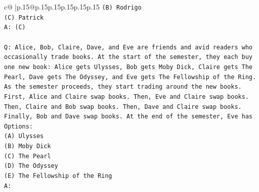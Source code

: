 \documentclass{article}
\begin{document}
{\begin{supertabular}{c@{$\;$}|p{.15\linewidth}@{}p{.15\linewidth}p{.15\linewidth}p{.15\linewidth}p{.15\linewidth}p{.15\linewidth}}
{{{\texttt{(B) Rodrigo} \\
\texttt{(C) Patrick} \\
\texttt{A: (C)} \\
\\ 
\texttt{Q: Alice, Bob, Claire, Dave, and Eve are friends and avid readers who occasionally trade books. At the start of the semester, they each buy one new book: Alice gets Ulysses, Bob gets Moby Dick, Claire gets The Pearl, Dave gets The Odyssey, and Eve gets The Fellowship of the Ring.} \\
\texttt{As the semester proceeds, they start trading around the new books. First, Alice and Claire swap books. Then, Eve and Claire swap books. Then, Claire and Bob swap books. Then, Dave and Claire swap books. Finally, Bob and Dave swap books. At the end of the semester, Eve has} \\
\texttt{Options:} \\
\texttt{(A) Ulysses} \\
\texttt{(B) Moby Dick} \\
\texttt{(C) The Pearl} \\
\texttt{(D) The Odyssey} \\
\texttt{(E) The Fellowship of the Ring} \\
\texttt{A:} \\
            }
        }
    }
     \\ \\


\end{supertabular}}
\end{document}
